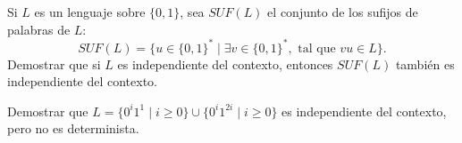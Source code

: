 \begin{ejercicio}\label{ej:1.6.18}
    Si $L$ es un lenguaje sobre $\{0,1\}$, sea $SUF(L)$ el conjunto de los sufijos de palabras de $L$: 
    \begin{equation*}
        SUF(L) = \{u\in {\{0,1\}}^{\ast} \mid \exists v\in {\{0,1\}}^{\ast}, \text{\ tal que\ } vu\in L\}.
    \end{equation*}
    Demostrar que si $L$ es independiente del contexto, entonces $SUF(L)$ también es independiente del contexto.
\end{ejercicio}

\begin{ejercicio}\label{ej:1.6.19}
    Demostrar que $L=\{0^i 1^1 \mid i\geq 0\} \cup \{0^i1^{2i} \mid i\geq 0\}$ es independiente del contexto, pero no es determinista.
\end{ejercicio}

